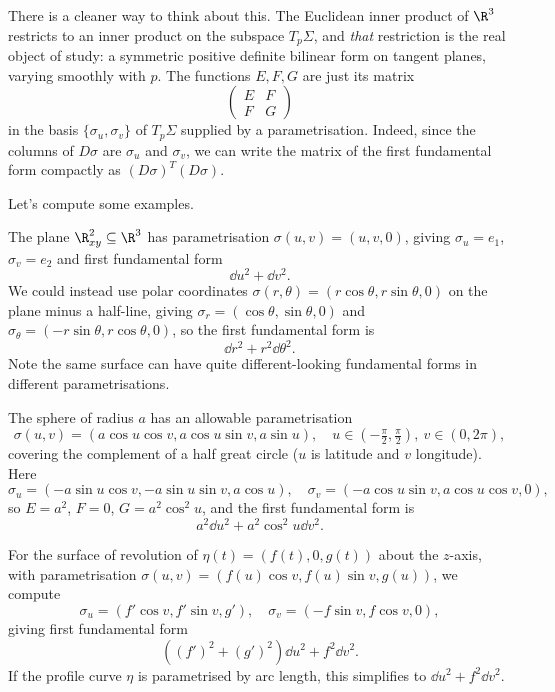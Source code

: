 \begin{remark}
    There is a cleaner way to think about this. The Euclidean inner product of $\R^3$ restricts to an inner product on the subspace $T_p \Sigma$, and \emph{that} restriction is the real object of study: a symmetric positive definite bilinear form on tangent planes, varying smoothly with $p$. The functions $E, F, G$ are just its matrix
    $$
    \begin{pmatrix} E & F \\ F & G \end{pmatrix}
    $$
    in the basis $\{\sigma_u, \sigma_v\}$ of $T_p\Sigma$ supplied by a parametrisation. Indeed, since the columns of $D\sigma$ are $\sigma_u$ and $\sigma_v$, we can write the matrix of the first fundamental form compactly as $(D\sigma)^T (D\sigma)$.
\end{remark}

Let's compute some examples.

\begin{example}
    The plane $\R^2_{xy} \subseteq \R^3$ has parametrisation $\sigma(u, v) = (u, v, 0)$, giving $\sigma_u = e_1$, $\sigma_v = e_2$ and first fundamental form
    $$
    \dd u^2 + \dd v^2.
    $$
    We could instead use polar coordinates $\sigma(r, \theta) = (r\cos\theta, r\sin\theta, 0)$ on the plane minus a half-line, giving $\sigma_r = (\cos\theta, \sin\theta, 0)$ and $\sigma_\theta = (-r\sin\theta, r\cos\theta, 0)$, so the first fundamental form is
    $$
    \dd r^2 + r^2 \dd \theta^2.
    $$
    Note the same surface can have quite different-looking fundamental forms in different parametrisations.
\end{example}

\begin{example}\label{ex:sphereFFF}
    The sphere of radius $a$ has an allowable parametrisation
    $$
    \sigma(u, v) = (a \cos u \cos v, a \cos u \sin v, a \sin u), \quad u \in \left(-\tfrac{\pi}{2}, \tfrac{\pi}{2}\right),\ v \in (0, 2\pi),
    $$
    covering the complement of a half great circle ($u$ is latitude and $v$ longitude). Here
    $$
    \sigma_u = (-a\sin u \cos v, -a \sin u \sin v, a \cos u), \quad \sigma_v = (-a \cos u \sin v, a \cos u \cos v, 0),
    $$
    so $E = a^2$, $F = 0$, $G = a^2 \cos^2 u$, and the first fundamental form is
    $$
    a^2 \dd u^2 + a^2 \cos^2 u \dd v^2.
    $$
\end{example}

\begin{example}\label{ex:revolutionFFF}
    For the surface of revolution of $\eta(t) = (f(t), 0, g(t))$ about the $z$-axis, with parametrisation $\sigma(u, v) = (f(u)\cos v, f(u) \sin v, g(u))$, we compute
    $$
    \sigma_u = (f'\cos v, f' \sin v, g'), \quad \sigma_v = (-f \sin v, f\cos v, 0),
    $$
    giving first fundamental form
    $$
    \left((f')^2 + (g')^2\right) \dd u^2 + f^2 \dd v^2.
    $$
    If the profile curve $\eta$ is parametrised by arc length, this simplifies to $\dd u^2 + f^2 \dd v^2$.
\end{example}

